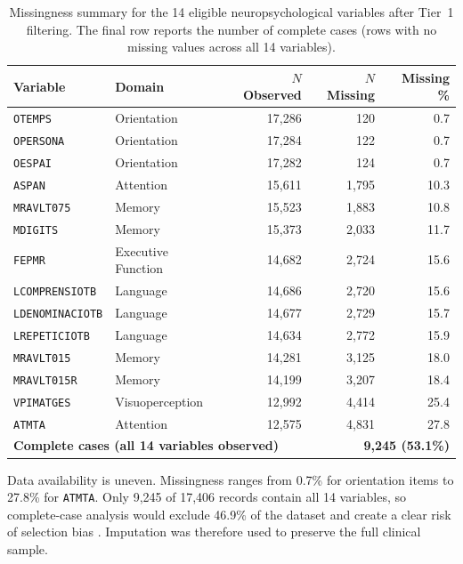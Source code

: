 \begin{table}[ht]
\caption{Missingness summary for the 14 eligible neuropsychological variables after Tier~1 filtering. The final row reports the number of complete cases (rows with no missing values across all 14 variables).}
\label{tab:missing_descriptive}
\centering
\small
\begin{tabular}{l l r r r}
\toprule
\textbf{Variable} & \textbf{Domain} & \textbf{$N$ Observed} & \textbf{$N$ Missing} & \textbf{Missing \%} \\
\midrule
\texttt{OTEMPS}          & Orientation        & 17{,}286 &   120 &  0.7 \\
\texttt{OPERSONA}        & Orientation        & 17{,}284 &   122 &  0.7 \\
\texttt{OESPAI}          & Orientation        & 17{,}282 &   124 &  0.7 \\
\texttt{ASPAN}           & Attention          & 15{,}611 & 1{,}795 & 10.3 \\
\texttt{MRAVLT075}       & Memory             & 15{,}523 & 1{,}883 & 10.8 \\
\texttt{MDIGITS}         & Memory             & 15{,}373 & 2{,}033 & 11.7 \\
\texttt{FEPMR}           & Executive Function & 14{,}682 & 2{,}724 & 15.6 \\
\texttt{LCOMPRENSIOTB}   & Language           & 14{,}686 & 2{,}720 & 15.6 \\
\texttt{LDENOMINACIOTB}  & Language           & 14{,}677 & 2{,}729 & 15.7 \\
\texttt{LREPETICIOTB}    & Language           & 14{,}634 & 2{,}772 & 15.9 \\
\texttt{MRAVLT015}       & Memory             & 14{,}281 & 3{,}125 & 18.0 \\
\texttt{MRAVLT015R}      & Memory             & 14{,}199 & 3{,}207 & 18.4 \\
\texttt{VPIMATGES}       & Visuoperception    & 12{,}992 & 4{,}414 & 25.4 \\
\texttt{ATMTA}           & Attention          & 12{,}575 & 4{,}831 & 27.8 \\
\midrule
\multicolumn{3}{l}{\textbf{Complete cases (all 14 variables observed)}} & \multicolumn{2}{r}{\textbf{9{,}245 (53.1\%)}} \\
\bottomrule
\end{tabular}
\end{table}

Data availability is uneven. Missingness ranges from 0.7\% for orientation items to 27.8\% for \texttt{ATMTA}. Only 9{,}245 of 17{,}406 records contain all 14 variables, so complete-case analysis would exclude 46.9\% of the dataset and create a clear risk of selection bias \parencite{rubin1976inference}. Imputation was therefore used to preserve the full clinical sample.

